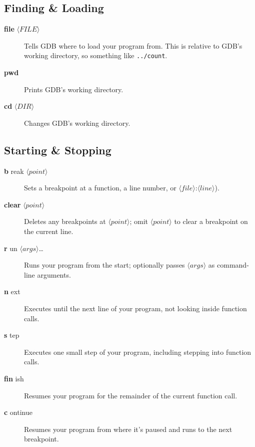 \documentclass[11pt]{article}
\newcommand\dbc[2]{{%
  \sffamily\upshape\mdseries
  \textbf{\textcolor{Abbreviation} {#1}}%
  #2}}
\newcommand\abw[1]{$\langle\mathit{#1}\rangle$}
\begin{document}
\begin{multicols}{2}
\subsection*{Finding \& Loading}

\begin{description}
  \item[\dbc{file}{} \abw{FILE}] Tells GDB where to load your program
    from. This is relative to GDB’s working directory, so
    something like \verb!../count!.

  \item[\dbc{pwd}{}] Prints GDB’s working directory.

  \item[\dbc{cd}{} \abw{DIR}] Changes GDB’s working directory.
\end{description}

\subsection*{Starting \& Stopping}
\begin{description}

  \item[\dbc{b}{reak} \abw{point}] Sets a breakpoint at a function, a
    line number, or \abw{file}:\abw{line}).

  \item[\dbc{clear}{} \abw{point}] Deletes any breakpoints at
    \abw{point}; omit \abw{point} to clear a breakpoint on the current
    line.

  \item[\dbc{r}{un} \abw{args}\ldots] Runs your program from the start;
    optionally passes \abw{args} as command-line arguments.

  \item[\dbc{n}{ext}] Executes until the next line of your program, not
    looking inside function calls.

  \item[\dbc{s}{tep}] Executes one small step of your program, including
    stepping into function calls.

  \item[\dbc{fin}{ish}] Resumes your program for the remainder of the
    current function call.

  \item[\dbc{c}{ontinue}] Resumes your program from where it’s paused
    and runs to the next breakpoint.

\end{description}


\end{multicols}
\end{document}
